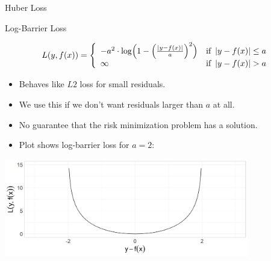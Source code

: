 \begin{vbframe}{Huber Loss}
\begin{itemize}
\end{itemize}



\end{vbframe}



\begin{vbframe}{Log-Barrier Loss}

\begin{small}
\[
  L(y, f(x)) = \left\{\begin{array}{lr}
        -a^{2} \cdot \log \Bigl( 1 - \Bigl(\frac{\left|y - f(x)\right|}{a}\Bigr)^2 \Bigr) & \text{if } \left|y-f(x)\right| \leq a \\
        \infty & \text{if } \left|y-f(x)\right|  > a
        \end{array}\right.
  \]
\end{small}

\begin{itemize}
\item Behaves like $L2$ loss for small residuals.
\item We use this if we don't want residuals larger than $a$ at all.
\item No guarantee that the risk minimization problem has a solution.
\item Plot shows log-barrier loss for $a=2$:
\end{itemize}

\begin{center}
\includegraphics[width = 0.8\textwidth]{figure/loss_logbarrier_1.png}
\end{center}


\end{vbframe}



